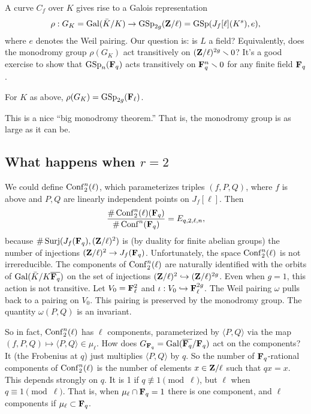 A curve $C_f$ over $K$ gives rise to a Galois representation 
\[
  \rho:G_K=\operatorname{Gal}(\bar K/K) \to \operatorname{GSp}_{2 g}(\mathbf{Z}/\ell) = \operatorname{GSp}(J_f[\ell](K^s),e),
\]
where $e$ denotes the Weil pairing. Our question is: is $L$ a field? 
Equivalently, does the monodromy group $\rho(G_K)$ act transitively on 
$(\mathbf{Z}/\ell)^{2 g}\smallsetminus 0$? It's a good exercise to show that 
$\operatorname{GSp}_n(\mathbf{F}_q)$ acts transitively on $\mathbf{F}_q^n\smallsetminus 0$ 
for any finite field $\mathbf{F}_q$. 

\begin{theo}[J-K Yu, 1995]
For $K$ as above, $\rho(G_K) = \operatorname{GSp}_{2 g}(\mathbf{F}_\ell)$. 
\end{theo}

This is a nice ``big monodromy theorem.'' That is, the monodromy group is as 
large as it can be. 





\subsection{What happens when \texorpdfstring{$r=2$}{r=2}}

We could define $\operatorname{Conf}_2^n(\ell)$, which parameterizes triples 
$(f,P,Q)$, where $f$ is above and $P,Q$ are linearly independent points on 
$J_f[\ell]$. Then 
\[
  \frac{\#\operatorname{Conf}_2^n(\ell)(\mathbf{F}_q)}{\#\operatorname{Conf}^n(\mathbf{F}_q)} = E_{q,2,\ell,n} ,
\]
because $\#\operatorname{Surj}(J_f(\mathbf{F}_q),(\mathbf{Z}/\ell)^2)$ is (by duality for finite 
abelian groups) the number of injections $(\mathbf{Z}/\ell)^2 \to J_f(\mathbf{F}_q)$. 
Unfortunately, the space $\operatorname{Conf}_2^n(\ell)$ is not irrereducible. The 
components of $\operatorname{Conf}_2^n(\ell)$ are naturally identified with the 
orbits of $\operatorname{Gal}(\bar K/K\overline{\mathbf{F}_q})$ on the set of injections 
$(\mathbf{Z}/\ell)^2 \hookrightarrow (\mathbf{Z}/\ell)^{2g}$. Even when $g=1$, this action is 
not transitive. Let $V_0=\mathbf{F}_\ell^2$ and 
$\iota:V_0\hookrightarrow\mathbf{F}_\ell^{2g}$. The Weil pairing $\omega$ pulls back 
to a pairing on $V_0$. This pairing is preserved by the monodromy group. The 
quantity $\omega(P,Q)$ is an invariant. 

So in fact, $\operatorname{Conf}_2^n(\ell)$ has $\ell$ components, parameterized by 
$\langle P,Q\rangle$ via the map 
$(f,P,Q)\mapsto \langle P,Q\rangle\in \mu_\ell$. How does 
$G_{\mathbf{F}_q} = \operatorname{Gal}(\overline{\mathbf{F}_q}/\mathbf{F}_q)$ act on the components? It (the 
Frobenius at $q$) just multiplies $\langle P,Q\rangle$ by $q$. So the 
number of $\mathbf{F}_q$-rational components of $\operatorname{Conf}_2^n(\ell)$ is the 
number of elements $x\in \mathbf{Z}/\ell$ such that $q x=x$. This depends strongly on 
$q$. It is 1 if $q\not\equiv 1\pmod\ell$, but $\ell$ when $q\equiv 1\pmod\ell$.
That is, when $\mu_\ell\cap \mathbf{F}_q=1$ there is one component, and 
$\ell$ components if $\mu_\ell\subset \mathbf{F}_q$. 

